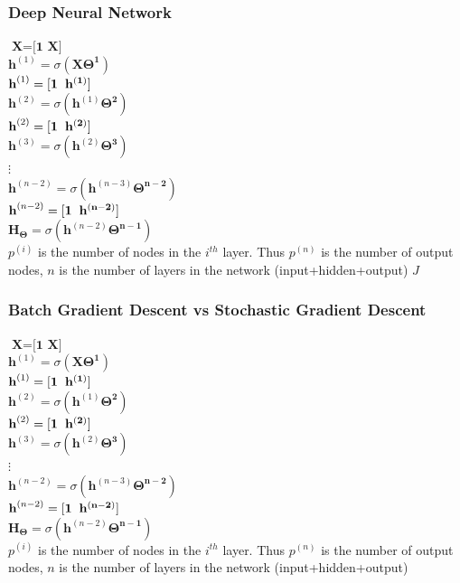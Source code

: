 \documentclass{beamer}
\begin{document}
    \begin{frame}
    	\frametitle{Deep Neural Network}
    	$\textbf{X}=\textbf{[1 X]}$\\
    	$\textbf{h}^{(1)}=\sigma(\mathbf{X}\mathbf{\Theta^{1}})$ \\
    	$\textbf{h}^{(1)}=\mathbf{[1 \hspace{0.2cm}h^{(1)}]}$\\
    	$\textbf{h}^{(2)}=\sigma(\textbf{h}^{(1)}\mathbf{\Theta^{2}})$ \\
    	$\textbf{h}^{(2)}=\mathbf{[1 \hspace{0.2cm}h^{(2)}]}$\\
    	$\textbf{h}^{(3)}=\sigma(\textbf{h}^{(2)}\mathbf{\Theta^{3}})$ \\
    	$\vdots$\\
    	$\textbf{h}^{(n-2)}=\sigma(\textbf{h}^{(n-3)}\mathbf{\Theta^{n-2}})$ \\
    	$\textbf{h}^{(n-2)}=\mathbf{[1 \hspace{0.2cm}h^{(n-2)}]}$\\
    	$\textbf{H}_{\mathbf{\Theta}}=\sigma(\textbf{h}^{(n-2)}\mathbf{\Theta^{n-1}})$ \\
    	$p^{(i)}$ is the number of nodes in the $i^{th}$ layer. Thus $p^{(n)}$ is the number of output nodes,
    	$n$ is the number of layers in the network (input+hidden+output)
    	$J$
    \end{frame} 

  \begin{frame}
  	\frametitle{Batch Gradient Descent vs Stochastic Gradient Descent}
    	$\textbf{X}=\textbf{[1 X]}$\\
    	$\textbf{h}^{(1)}=\sigma(\mathbf{X}\mathbf{\Theta^{1}})$ \\
    	$\textbf{h}^{(1)}=\mathbf{[1 \hspace{0.2cm}h^{(1)}]}$\\
    	$\textbf{h}^{(2)}=\sigma(\textbf{h}^{(1)}\mathbf{\Theta^{2}})$ \\
    	$\textbf{h}^{(2)}=\mathbf{[1 \hspace{0.2cm}h^{(2)}]}$\\
    	$\textbf{h}^{(3)}=\sigma(\textbf{h}^{(2)}\mathbf{\Theta^{3}})$ \\
    	$\vdots$\\
    	$\textbf{h}^{(n-2)}=\sigma(\textbf{h}^{(n-3)}\mathbf{\Theta^{n-2}})$ \\
    	$\textbf{h}^{(n-2)}=\mathbf{[1 \hspace{0.2cm}h^{(n-2)}]}$\\
    	$\textbf{H}_{\mathbf{\Theta}}=\sigma(\textbf{h}^{(n-2)}\mathbf{\Theta^{n-1}})$ \\
    	$p^{(i)}$ is the number of nodes in the $i^{th}$ layer. Thus $p^{(n)}$ is the number of output nodes,
    	$n$ is the number of layers in the network (input+hidden+output)			
  \end{frame}
  
\end{document}
